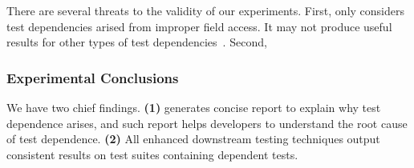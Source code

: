 There are several threats to the validity
of our experiments. First, \dtexplain 
only considers test dependencies arised
from improper field access. It may not
produce useful results for other types of
test dependencies~\cite{}. Second,

\subsubsection{Experimental Conclusions}

We have two chief findings. \textbf{(1)} \dtexplain
generates concise report to explain why
test dependence arises, and such report
helps developers to understand the root cause
of test dependence. \textbf{(2)} All
enhanced downstream testing techniques
output consistent results on test suites
containing dependent tests.
